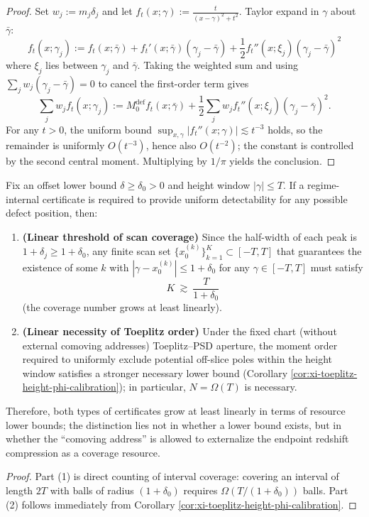 \begin{proof}
Set \(w_j:=m_j\delta_j\) and let \(f_t(x;\gamma):=\frac{t}{(x-\gamma)^2+t^2}\).
Taylor expand in \(\gamma\) about \(\bar\gamma\):
\[
f_t(x;\gamma_j)
:=f_t(x;\bar\gamma)
+f_t'(x;\bar\gamma)(\gamma_j-\bar\gamma)
+\frac12 f_t''(x;\xi_j)(\gamma_j-\bar\gamma)^2
\]
where \(\xi_j\) lies between \(\gamma_j\) and \(\bar\gamma\).
Taking the weighted sum and using \(\sum_j w_j(\gamma_j-\bar\gamma)=0\) to cancel the first-order term gives
\[
\sum_j w_j f_t(x;\gamma_j)
:=M_0^{\mathrm{def}} f_t(x;\bar\gamma)
+\frac12\sum_j w_j f_t''(x;\xi_j)(\gamma_j-\bar\gamma)^2.
\]
For any \(t>0\), the uniform bound \(\sup_{x,\gamma}|f_t''(x;\gamma)|\lesssim t^{-3}\) holds, so the remainder is uniformly \(O(t^{-3})\), hence also \(O(t^{-2})\);
the constant is controlled by the second central moment. Multiplying by \(1/\pi\) yields the conclusion. \qedhere
\end{proof}
\begin{proposition}\label{prop:xi-toeplitz-vs-scan-linear-lowerbound}
Fix an offset lower bound \(\delta\ge\delta_0>0\) and height window \(|\gamma|\le T\).
If a regime-internal certificate is required to provide uniform detectability for any possible defect position, then:
\begin{enumerate}
  \item \textbf{(Linear threshold of scan coverage)} Since the half-width of each peak is \(1+\delta_j\ge 1+\delta_0\), any finite scan set \(\{x_0^{(k)}\}_{k=1}^{K}\subset[-T,T]\) that guarantees the existence of some \(k\) with \(|\gamma-x_0^{(k)}|\le 1+\delta_0\) for any \(\gamma\in[-T,T]\) must satisfy
  \[
  \boxed{\;K\ \gtrsim\ \frac{T}{1+\delta_0}\;}
  \]
  (the coverage number grows at least linearly).
  \item \textbf{(Linear necessity of Toeplitz order)} Under the fixed chart (without external comoving addresses) Toeplitz--PSD aperture, the moment order required to uniformly exclude potential off-slice poles within the height window satisfies a stronger necessary lower bound (Corollary \ref{cor:xi-toeplitz-height-phi-calibration}); in particular, \(N=\Omega(T)\) is necessary.
\end{enumerate}
Therefore, both types of certificates grow at least linearly in terms of resource lower bounds; the distinction lies not in whether a lower bound exists, but in whether the ``comoving address'' is allowed to externalize the endpoint redshift compression as a coverage resource.
\end{proposition}
\begin{proof}
Part (1) is direct counting of interval coverage: covering an interval of length \(2T\) with balls of radius \((1+\delta_0)\) requires \(\Omega(T/(1+\delta_0))\) balls.
Part (2) follows immediately from Corollary \ref{cor:xi-toeplitz-height-phi-calibration}. \qedhere
\end{proof}




